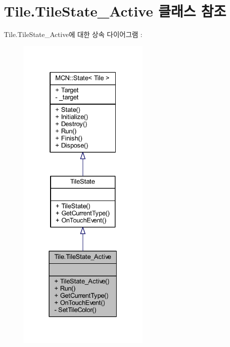 \hypertarget{class_tile_1_1_tile_state___active}{}\section{Tile.\+Tile\+State\+\_\+\+Active 클래스 참조}
\label{class_tile_1_1_tile_state___active}


Tile.\+Tile\+State\+\_\+\+Active에 대한 상속 다이어그램 \+: \nopagebreak
\begin{figure}[H]
\begin{center}
\leavevmode
\includegraphics[width=184pt]{class_tile_1_1_tile_state___active__inherit__graph}
\end{center}
\end{figure}



